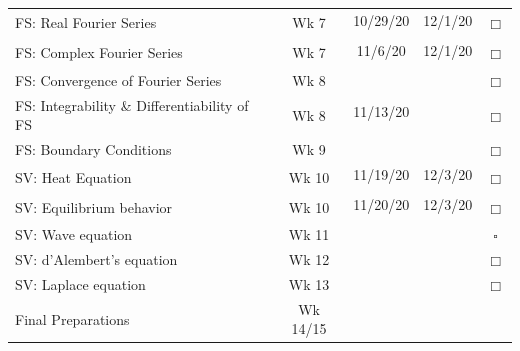 \documentclass{article}
\newcommand{\checked}{\makebox[0pt][l]{$\checkmark$}$\square$}
\newcommand{\unchecked}{$\Box$}
\begin{document}
\begin{tabular}{|l|c|c|c|c}
\multirow{2}{5cm}{FS: Real Fourier Series} & \multirow{2}{1.5cm}{Wk 7}  & 10/29/20 & 12/1/20 &  \multirow{2}{.4cm}{\unchecked} \\ &&&& \\ \cline{1-4}
\multirow{2}{5cm}{FS: Complex Fourier Series} & \multirow{2}{1.5cm}{Wk 7} & 11/6/20 & 12/1/20 & \multirow{2}{.4cm}{\unchecked} \\ &&&& \\ \cline{1-4}
\multirow{2}{7cm}{FS: Convergence of Fourier Series} & \multirow{2}{1.5cm}{Wk 8} &&& \multirow{2}{.4cm}{\unchecked} \\ &&&& \\  \cline{1-4}
\multirow{2}{7cm}{FS: Integrability \& Differentiability of FS} & \multirow{2}{1.5cm}{Wk 8} & 11/13/20 &         & \multirow{2}{.4cm}{\unchecked} \\ &&&& \\  \cline{1-4}
\multirow{2}{5cm}{FS: Boundary Conditions} & \multirow{2}{1.5cm}{Wk 9} &&& \multirow{2}{.4cm}{\unchecked} \\ &&&& \\ \cline{1-4}
\multirow{2}{5cm}{SV: Heat Equation} & \multirow{2}{1.5cm}{Wk 10} & 11/19/20 & 12/3/20 & \multirow{2}{.4cm}{\unchecked} \\ &&&& \\ \cline{1-4}
\multirow{2}{5cm}{SV: Equilibrium behavior} & \multirow{2}{1.5cm}{Wk 10} & 11/20/20 & 12/3/20 & \multirow{2}{.4cm}{\unchecked} \\ &&&& \\ \cline{1-4}
\multirow{2}{5cm}{SV: Wave equation} & \multirow{2}{1.5cm}{Wk 11} &      &            & \multirow{2}{.4cm}{\checked} \\ &&&& \\ \cline{1-4}
\multirow{2}{5cm}{SV: d'Alembert's equation} & \multirow{2}{1.5cm}{Wk 12} &&& \multirow{2}{.4cm}{\unchecked} \\ &&&& \\ \cline{1-4}
\multirow{2}{5cm}{SV: Laplace equation} & \multirow{2}{1.5cm}{Wk 13} &&& \multirow{2}{.4cm}{\unchecked} \\ &&&& \\ \cline{1-4}
\multirow{2}{5cm}{Final Preparations} & \multirow{2}{1.8cm}{Wk 14/15} &&&   \\&&&& \\ \cline{1-4}
\end{tabular}
\newpage
\end{document}
